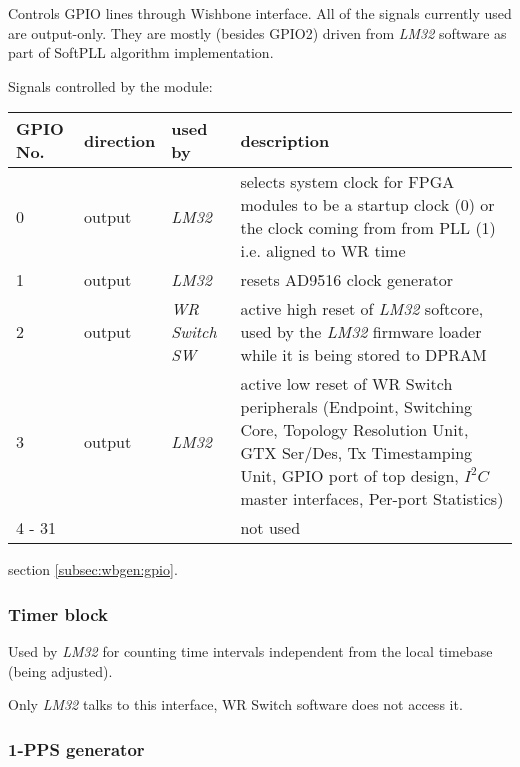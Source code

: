 Controls GPIO lines through Wishbone interface. All of the signals currently
used are output-only. They are mostly (besides GPIO2) driven from \emph{LM32}
software as part of SoftPLL algorithm implementation.

Signals controlled by the module:

\begin{center}
  \begin{tabular}{|l|l|l|p{8cm}|}
    \hline
    {\bf GPIO No.} & {\bf direction} & {\bf used by} & {\bf description}\\
    \hline
    \hline
    0 & output & \emph{LM32} & selects system clock for FPGA modules to be a startup clock (0) or the
    clock coming from from PLL (1) i.e. aligned to WR time\\
    1 & output & \emph{LM32} & resets AD9516 clock generator\\
    2 & output & \emph{WR Switch SW} & active high reset of \emph{LM32} softcore, used by
    the \emph{LM32} firmware loader while it is being stored to DPRAM\\
    3 & output & \emph{LM32} & active low reset of WR Switch peripherals (Endpoint,
    Switching Core, Topology Resolution Unit, GTX Ser/Des, Tx Timestamping Unit,
    GPIO port of top design, $I^2C$ master interfaces, Per-port Statistics)\\
    4 - 31 & && not used\\ %
    \hline
  \end{tabular}
\end{center}

 section \ref{subsec:wbgen:gpio}.

\subsubsection{Timer block}

Used by \emph{LM32} for counting time intervals independent from the local
timebase (being adjusted).\\


Only \emph{LM32} talks to this interface, WR Switch software does not access it.

\subsubsection{1-PPS generator}

